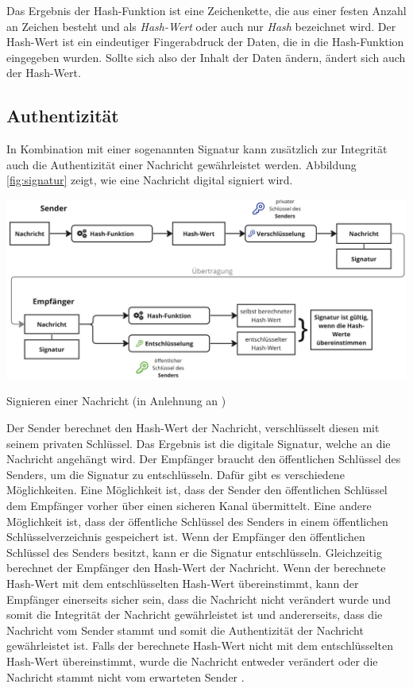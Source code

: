 Das Ergebnis der Hash-Funktion ist eine Zeichenkette, die aus einer festen Anzahl an Zeichen besteht und als \textit{Hash-Wert} oder auch nur \textit{Hash} bezeichnet wird. Der Hash-Wert ist ein eindeutiger Fingerabdruck der Daten, die in die Hash-Funktion eingegeben wurden. Sollte sich also der Inhalt der Daten ändern, ändert sich auch der Hash-Wert. 


\subsection{Authentizität}

In Kombination mit einer sogenannten Signatur kann zusätzlich zur Integrität auch die Authentizität einer Nachricht gewährleistet werden. Abbildung \ref{fig:signatur} zeigt, wie eine Nachricht digital signiert wird.

\begin{center}
    \captionsetup{type=figure}
    \includegraphics[width=1\linewidth]{images/signatur_2.jpg}
    \caption{Signieren einer Nachricht (in Anlehnung an \cite{DocuSign_digitaleSignaturen})}
    \label{fig:signatur}
\end{center}


\noindent Der Sender berechnet den Hash-Wert der Nachricht, verschlüsselt diesen mit seinem privaten Schlüssel. Das Ergebnis ist die digitale Signatur, welche an die Nachricht angehängt wird. Der Empfänger braucht den öffentlichen Schlüssel des Senders, um die Signatur zu entschlüsseln. Dafür gibt es verschiedene Möglichkeiten. Eine Möglichkeit ist, dass der Sender den öffentlichen Schlüssel dem Empfänger vorher über einen sicheren Kanal übermittelt. Eine andere Möglichkeit ist, dass der öffentliche Schlüssel des Senders in einem öffentlichen Schlüsselverzeichnis gespeichert ist. Wenn der Empfänger den öffentlichen Schlüssel des Senders besitzt, kann er die Signatur entschlüsseln. Gleichzeitig berechnet der Empfänger den Hash-Wert der Nachricht. Wenn der berechnete Hash-Wert mit dem entschlüsselten Hash-Wert übereinstimmt, kann der Empfänger einerseits sicher sein, dass die Nachricht nicht verändert wurde und somit die Integrität der Nachricht gewährleistet ist und andererseits, dass die Nachricht vom Sender stammt und somit die Authentizität der Nachricht gewährleistet ist. Falls der berechnete Hash-Wert nicht mit dem entschlüsselten Hash-Wert übereinstimmt, wurde die Nachricht entweder verändert oder die Nachricht stammt nicht vom erwarteten Sender \Parencite[S. 73-78]{Hellmann_IT-Sicherheit}.


